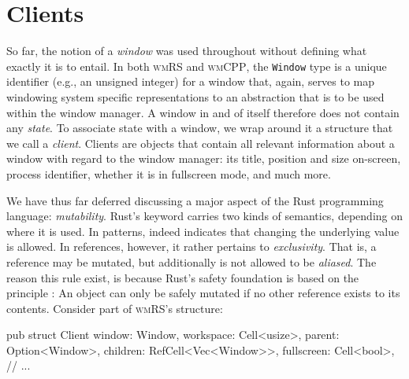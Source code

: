 \section{Clients}\label{clients}

So far, the notion of a \textit{window} was used throughout without defining
what exactly it is to entail. In both \textsc{wmRS} and \textsc{wmCPP}, the
\texttt{Window} type is a unique identifier (e.g., an unsigned integer) for a
window that, again, serves to map windowing system specific representations to
an abstraction that is to be used within the window manager. A window in and of
itself therefore does not contain any \textit{state}. To associate state with a
window, we wrap around it a structure that we call a \textit{client}. Clients
are objects that contain all relevant information about a window with regard to
the window manager: its title, position and size on-screen, process identifier,
whether it is in fullscreen mode, and much more.


We have thus far deferred discussing a major aspect of the Rust
programming language: \textit{mutability}. Rust's  keyword
carries two kinds of semantics, depending on where it is used. In
patterns,  indeed indicates that changing the underlying value
is allowed\cite{therustbook, intmutpatterns}. In references, however,
it rather pertains to \textit{exclusivity}. That is, a 
reference may be mutated, but additionally is not allowed to be
\textit{aliased}\cite{therustbook, intmutpatterns}. The reason this rule
exist, is because Rust's safety foundation is based on the principle
: An object can only be
safely mutated if no other reference exists to its contents\cite{therustbook,
therustreference}. Consider part of \textsc{wmRS}'s  structure:

\begin{rustblock}
  pub struct Client {
    window: Window,
    workspace: Cell<usize>,
    parent: Option<Window>,
    children: RefCell<Vec<Window>>,
    fullscreen: Cell<bool>,
    // ...
  }
\end{rustblock}

